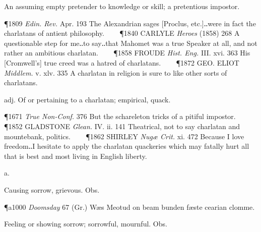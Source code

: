 \begin{description}[wide, labelwidth=!, labelindent=0pt]
\begin{myenumerate}
 An assuming empty pretender to knowledge or skill; a pretentious impostor.

\P 1809 \textit{Edin.  Rev.} Apr. 193 The Alexandrian sages [Proclus, etc.]‥were in fact the charlatans of antient philosophy.    
\P 1840 CARLYLE  \textit{Heroes} (1858) 268 A questionable step for me‥to say‥that Mahomet was a true Speaker at all, and not rather an ambitious charlatan.    
\P 1858 FROUDE  \textit{Hist. Eng.} III. xvi. 363 His [Cromwell's] true creed was a hatred of charlatans.    
\P 1872 GEO. ELIOT  \textit{Middlem.} v. xlv. 335 A charlatan in religion is sure to like other sorts of charlatans.

 adj. Of or pertaining to a charlatan; empirical, quack.

\P 1671 \textit{True  Non-Conf.} 376 But the schareleton tricks of a pitiful impostor.    
\P 1852 GLADSTONE  \textit{Glean.} IV. ii. 141 Theatrical, not to say charlatan and mountebank, politics.    
\P 1862 SHIRLEY  \textit{Nugæ Crit.} xi. 472 Because I love freedom‥I hesitate to apply the charlatan quackeries which may fatally hurt all that is best and most living in English liberty.
\end{myenumerate}


 a.

\noindent {}

\noindent [OE. \phonetic{ceariᴁ} = OS. carag (in môdcarag), OHG. charag: —OTeut. type *karag-oz, f. karâ- sorrow, trouble, care. With the sense-development cf. careful.

   The palatalization of initial ca- in this word, while it remains guttural in
care, is thus accounted for: in the n. the original OE. type was nom. caru, gen.
*cære, whence ceare (cf. cæster, ceaster etc.); so app. the derivative
\phonetic{*cæriᴁ}, whence \phonetic{ceariᴁ}, with palatal ce- becoming ch-. But the n. retained guttural c in the nom. (even when by u- umlaut it was occasionally written cearu), so that no such form as chare is found in ME. As to sense 3 cf. chare a.]
\vspace{-0.3cm}

\begin{myenumerate}

 Causing sorrow, grievous. Obs.

\P a1000 \textit{Doomsday}  67 (Gr.) Wæs Meotud on beam bunden fæste cearian clomme.

 Feeling or showing sorrow; sorrowful, mournful. Obs.


\end{myenumerate}
\end{description}
